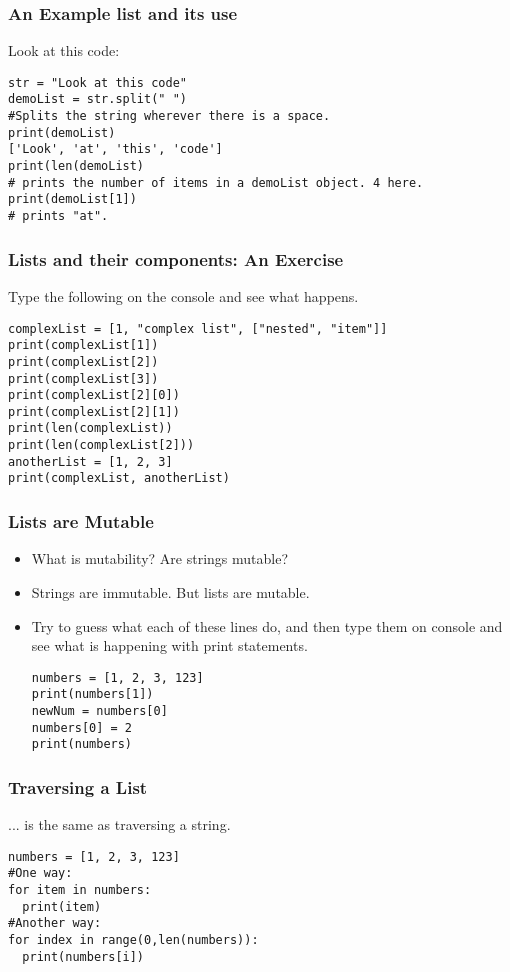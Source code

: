 \documentclass{beamer}
\begin{document}
\begin{frame}[fragile]
\frametitle{An Example list and its use}
Look at this code:
\begin{verbatim}
str = "Look at this code"
demoList = str.split(" ") 
#Splits the string wherever there is a space.
print(demoList)
['Look', 'at', 'this', 'code']
print(len(demoList) 
# prints the number of items in a demoList object. 4 here.
print(demoList[1]) 
# prints "at".
\end{verbatim}

\end{frame}

\begin{frame}[fragile]
\frametitle{Lists and their components: An Exercise}
Type the following on the console and see what happens.
\begin{verbatim}
complexList = [1, "complex list", ["nested", "item"]]
print(complexList[1])
print(complexList[2])
print(complexList[3])
print(complexList[2][0])
print(complexList[2][1])
print(len(complexList))
print(len(complexList[2]))
anotherList = [1, 2, 3]
print(complexList, anotherList)
\end{verbatim}
\end{frame}

\begin{frame}[fragile]
\frametitle{Lists are Mutable}
\begin{itemize}
\item What is mutability? Are strings mutable? \pause
\item Strings are immutable. But lists are mutable.
\item Try to guess what each of these lines do, and then type them on console and see what is happening with print statements.
\begin{verbatim}
numbers = [1, 2, 3, 123]
print(numbers[1])
newNum = numbers[0]
numbers[0] = 2
print(numbers)
\end{verbatim}
\end{itemize}
\end{frame}

\begin{frame}[fragile]
\frametitle{Traversing a List}
... is the same as traversing a string.
\begin{verbatim}
numbers = [1, 2, 3, 123]
#One way:
for item in numbers:
  print(item)
#Another way:
for index in range(0,len(numbers)):
  print(numbers[i])
\end{verbatim}
\end{frame}
\end{document}
